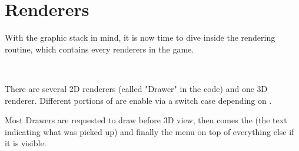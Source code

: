 \section{Renderers}
With the graphic stack in mind, it is now time to dive inside the rendering routine,  which contains every renderers in the game.\\
\par
{}\\
\par
 There are several 2D renderers (called "Drawer" in the code) and one 3D renderer. Different portions of  are enable via a switch case depending on .\\
 \par
  Most Drawers are requested to draw before 3D view, then comes the  (the text indicating what was picked up) and finally the menu on top of everything else if it is visible.
